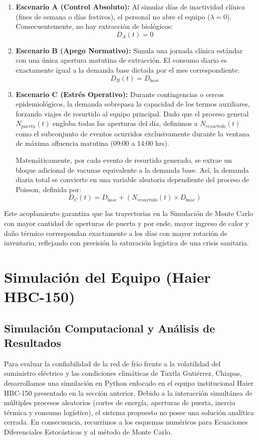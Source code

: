\documentclass[
  spanish,
  us-letterpaper,
]{scrreprt}
\numberwithin{equation}{section}
\theoremstyle{plain}
\theoremstyle{plain}
\theoremstyle{plain}
\theoremstyle{definition}
\theoremstyle{remark}
\begin{document}
\begin{enumerate}
\def\labelenumi{\arabic{enumi}.}
\item
  \textbf{Escenario A (Control Absoluto):} Al simular días de
  inactividad clínica (fines de semana o días festivos), el personal no
  abre el equipo (\(\lambda = 0\)). Consecuentemente, no hay extracción
  de biológicos: \[D_A(t) = 0\]
\item
  \textbf{Escenario B (Apego Normativo):} Simula una jornada clínica
  estándar con una única apertura matutina de extracción. El consumo
  diario es exactamente igual a la demanda base dictada por el mes
  correspondiente: \[D_B(t) = D_{base}\]
\item
  \textbf{Escenario C (Estrés Operativo):} Durante contingencias o
  cercos epidemiológicos, la demanda sobrepasa la capacidad de los
  termos auxiliares, forzando viajes de resurtido al equipo principal.
  Dado que el proceso general \(N_{puerta}(t)\) engloba todas las
  aperturas del día, definimos a \(N_{resurtido}(t)\) como el
  subconjunto de eventos ocurridos exclusivamente durante la ventana de
  máxima afluencia matutina (09:00 a 14:00 hrs).

  Matemáticamente, por cada evento de resurtido generado, se extrae un
  bloque adicional de vacunas equivalente a la demanda base. Así, la
  demanda diaria total se convierte en una variable aleatoria
  dependiente del proceso de Poisson, definida por:
  \[D_C(t) = D_{base} + \left( N_{resurtido}(t) \times D_{base} \right)\]
\end{enumerate}

Este acoplamiento garantiza que las trayectorias en la Simulación de
Monte Carlo con mayor cantidad de aperturas de puerta y por ende, mayor
ingreso de calor y daño térmico correspondan exactamente a los días con
mayor rotación de inventario, reflejando con precisión la saturación
logística de una crisis sanitaria.

\part{Simulación del Equipo (Haier HBC-150)}

\chapter{Simulación Computacional y Análisis de
Resultados}\label{sec-simulacion-computacional}

Para evaluar la confiabilidad de la red de frío frente a la volatilidad
del suministro eléctrico y las condiciones climáticas de Tuxtla
Gutiérrez, Chiapas, desarrollamos una simulación en Python enfocado en
el equipo institucional Haier HBC-150 presentado en la sección anterior.
Debido a la interacción simultánea de múltiples procesos aleatorios
(cortes de energía, aperturas de puerta, inercia térmica y consumo
logístico), el sistema propuesto no posee una solución analítica
cerrada. En consecuencia, recurrimos a los esquemas numéricos para
Ecuaciones Diferenciales Estocásticas y al método de Monte Carlo.
\end{document}
